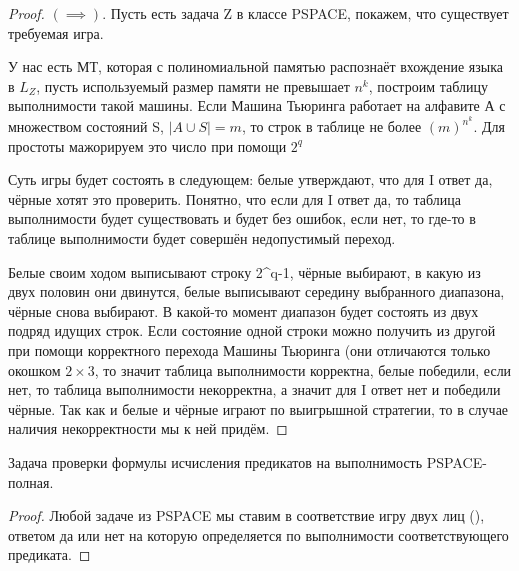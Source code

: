 \begin{proof}
	$(\implies)$. Пусть есть задача Z в классе PSPACE, покажем, что
	существует требуемая игра.

	У нас есть МТ, которая с полиномиальной памятью распознаёт вхождение
	языка в $L_Z$, пусть используемый размер памяти  не превышает $n^k$, построим
	таблицу выполнимости такой машины. Если Машина Тьюринга работает на
	алфавите А с множеством состояний S,  $|A\cup S| = m$, то строк в
	таблице не более $(m)^{n^k}$. Для простоты мажорируем это число при
	помощи $ 2^q$

	Суть игры будет состоять в следующем: белые утверждают, что для I ответ
	да, чёрные хотят это проверить. Понятно, что если для I ответ да, то
	таблица выполнимости будет существовать и будет без ошибок, если нет, то
	где-то в таблице выполнимости будет совершён недопустимый переход. 

	Белые своим ходом выписывают строку 2^{q-1}, чёрные выбирают, в какую из
	двух половин они двинутся, белые выписывают середину выбранного
	диапазона, чёрные снова выбирают. В какой-то момент диапазон будет
	состоять из двух подряд идущих строк. Если состояние одной строки можно
	получить из другой при помощи корректного перехода Машины Тьюринга (они
	отличаются только окошком $2\times 3$, то значит таблица выполнимости
	корректна, белые победили, если нет, то таблица выполнимости
	некорректна, а значит для I ответ нет и победили чёрные. Так как и белые
	и чёрные играют по выигрышной стратегии, то в случае наличия
	некорректности мы к ней придём. 
\end{proof}

 \begin{theorem}
	Задача проверки формулы исчисления предикатов на выполнимость
	PSPACE-полная.
\end{theorem}
 \begin{proof}
	 Любой задаче из PSPACE мы ставим в соответствие игру двух лиц
	 (), ответом да или нет на которую определяется по
	 выполнимости соответствующего предиката.
\end{proof}

